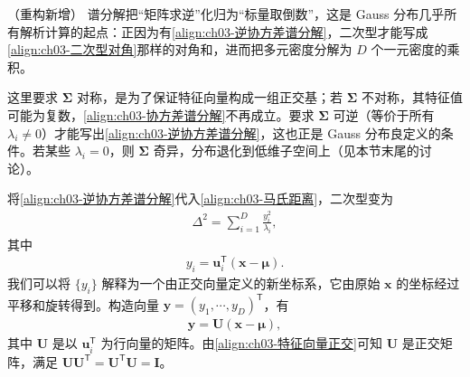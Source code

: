 \documentclass[../../main.tex]{subfiles}
\begin{document}
\begin{remark}（重构新增）
谱分解把“矩阵求逆”化归为“标量取倒数”，这是 Gauss 分布几乎所有解析计算的起点：正因为有\eqref{align:ch03-逆协方差谱分解}，二次型才能写成\eqref{align:ch03-二次型对角}那样的对角和，进而把多元密度分解为 $D$ 个一元密度的乘积。

这里要求 $\boldsymbol{\Sigma}$ 对称，是为了保证特征向量构成一组正交基；若 $\boldsymbol{\Sigma}$ 不对称，其特征值可能为复数，\eqref{align:ch03-协方差谱分解}不再成立。要求 $\boldsymbol{\Sigma}$ 可逆（等价于所有 $\lambda_i\neq0$）才能写出\eqref{align:ch03-逆协方差谱分解}，这也正是 Gauss 分布良定义的条件。若某些 $\lambda_i=0$，则 $\boldsymbol{\Sigma}$ 奇异，分布退化到低维子空间上（见本节末尾的讨论）。
\end{remark}

将\eqref{align:ch03-逆协方差谱分解}代入\eqref{align:ch03-马氏距离}，二次型变为
\begin{align}
\Delta^{2}=\sum_{i=1}^{D}\frac{y_{i}^{2}}{\lambda_{i}},
\label{align:ch03-二次型对角}
\end{align}
其中
\begin{align}
y_{i}=\boldsymbol{u}_{i}^{\mathsf{T}}(\boldsymbol{x}-\boldsymbol{\mu}).
\label{align:ch03-旋转坐标}
\end{align}
我们可以将 $\{y_{i}\}$ 解释为一个由正交向量定义的新坐标系，它由原始 $\boldsymbol{x}$ 的坐标经过平移和旋转得到。构造向量 $\boldsymbol{y}=(y_1,\cdots,y_D)^{\mathsf{T}}$，有
\begin{align}
\boldsymbol{y}=\boldsymbol{U}(\boldsymbol{x}-\boldsymbol{\mu}),
\label{align:ch03-旋转矩阵}
\end{align}
其中 $\boldsymbol{U}$ 是以 $\boldsymbol{u}_{i}^{\mathsf{T}}$ 为行向量的矩阵。由\eqref{align:ch03-特征向量正交}可知 $\boldsymbol{U}$ 是正交矩阵，满足 $\boldsymbol{U}\boldsymbol{U}^{\mathsf{T}}=\boldsymbol{U}^{\mathsf{T}}\boldsymbol{U}=\boldsymbol{I}$。
\end{document}
